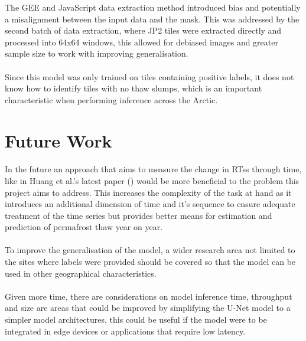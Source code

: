 The GEE and JavaScript data extraction method introduced bias and potentially a misalignment between the input data and the mask.  This was addressed by the second batch of data extraction, where JP2 tiles were extracted directly and processed into 64x64 windows, this allowed for debiased images and  greater sample size to work with improving generalisation.

\paragraph{}
Since this model was only trained on tiles containing positive labels, it does not know how to identify tiles with no thaw slumps, which is an important characteristic when performing inference across the Arctic. 

\section{Future Work}

\paragraph{}
In the future an approach that aims to measure the change in RTss through time, like in Huang et al.'s latest paper (\cite{HUANG2021102399}) would be more beneficial to the problem this project aims to address. This increases the complexity of the task at hand as it introduces an additional dimension of time and it's sequence to ensure adequate treatment of the time series but provides better means for estimation and prediction of permafrost thaw year on year.

\paragraph{}
To improve the generalisation of the model, a wider research area not limited to the sites where labels were provided should be covered so that the model can be used in other geographical characteristics.

\paragraph{}
Given more time, there are considerations on  model inference time, throughput and size are areas that could be improved by simplifying the U-Net model to a simpler model architectures, this could be useful if the model were to be integrated in edge devices or applications that require low latency.

